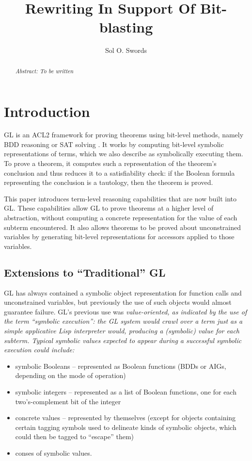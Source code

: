 \documentclass[submission,copyright,creativecommons]{eptcs}
\title{Rewriting In Support Of Bit-blasting}
\author{Sol O. Swords
\institute{Centaur Techology, Inc.\\
Austin, TX, USA}
\email{sswords@centtech.com}
}
\begin{document}
\maketitle

\begin{abstract}

{\it \color{red} Abstract: To be written}

\end{abstract}

\section{Introduction}
\label{sec:intro}

GL is an ACL2 framework for proving theorems using bit-level methods,
namely BDD reasoning or SAT solving \cite{bit-blasting-GL, gl-diss}.
It works by computing bit-level symbolic representations of terms,
which we also describe as symbolically executing them.  To prove a
theorem, it computes such a representation of the theorem's conclusion
and thus reduces it to a satisfiability check: if the Boolean formula
representing the conclusion is a tautology, then the theorem is
proved.

This paper introduces term-level reasoning capabilities that are now
built into GL.  These capabilities allow GL to prove theorems at a
higher level of abstraction, without computing a concrete
representation for the value of each subterm encountered.  It also
allows theorems to be proved about unconstrained variables by
generating bit-level representations for accessors applied to those
variables.

\subsection{Extensions to ``Traditional'' GL}

GL has always contained a symbolic object
representation for function calls and unconstrained variables, but
previously the use of such objects would almost guarantee failure.
GL's previous use was \em{value-oriented}, as indicated by the use of the
term ``symbolic execution'': the GL system would crawl over a term
just as a simple applicative Lisp interpreter would, producing a
(symbolic) value for each subterm.  Typical symbolic values expected
to appear during a successful symbolic execution could include:

\begin{itemize}
\item symbolic Booleans -- represented as Boolean functions (BDDs or
  AIGs, depending on the mode of operation)
\item symbolic integers -- represented as a list of Boolean functions,
  one for each two's-complement bit of the integer
\item concrete values -- represented by themselves (except for objects
  containing certain tagging symbols used to delineate kinds of
  symbolic objects, which could then be tagged to ``escape'' them)
\item conses of symbolic values.
\end{itemize}
\end{document}
